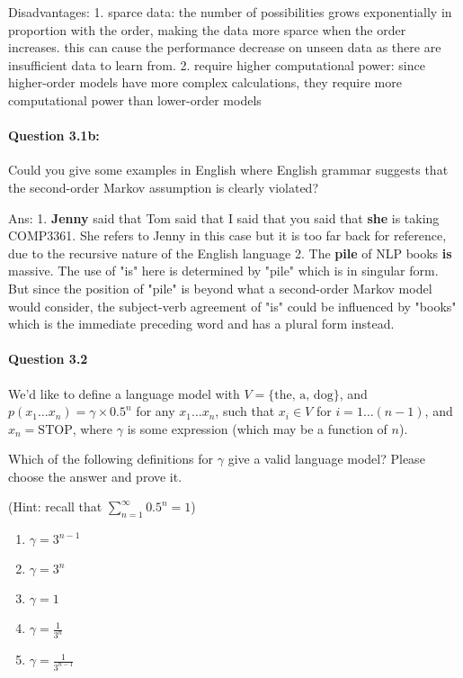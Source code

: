 \documentclass[10pt]{article}
\begin{document}
    Disadvantages:
    1. sparce data: the number of possibilities grows exponentially in proportion with the order, making the data more sparce when the order increases. this can cause the performance decrease on unseen data as there are insufficient data to learn from.
    2. require higher computational power: since higher-order models have more complex calculations, they require more computational power than lower-order models

\paragraph{Question 3.1b:} Could you give some examples in English where English grammar suggests that the second-order Markov assumption is clearly violated?

    Ans: 
            1. \textbf{Jenny} said that Tom said that I said that you said that \textbf{she} is taking COMP3361. 
            She refers to Jenny in this case but it is too far back for reference, due to the recursive nature of the       English language
            2. The \textbf{pile} of NLP books \textbf{is} massive.
            The use of "is" here is determined by "pile" which is in singular form. But since the position of "pile" is beyond what a second-order Markov model would consider, the subject-verb agreement of "is" could be influenced by "books" which is the immediate preceding word and has a plural form instead.


\newpage
\paragraph{Question 3.2}

We'd like to define a language model with \( V = \{\text{the, a, dog}\} \), and \( p(x_1 \ldots x_n) = \gamma \times 0.5^n \) for any \( x_1 \ldots x_n \), such that \( x_i \in V \) for \( i = 1 \ldots (n - 1) \), and \( x_n = \text{STOP} \), where \( \gamma \) is some expression (which may be a function of \( n \)).

Which of the following definitions for \( \gamma \) give a valid language model? Please choose the answer and prove it.

(Hint: recall that \( \sum_{n=1}^{\infty} 0.5^n = 1 \))

\begin{enumerate}
    \item \( \gamma = 3^{n-1} \)
    \item \( \gamma = 3^n \)
    \item \( \gamma = 1 \)
    \item \( \gamma = \frac{1}{3^n} \)
    \item \( \gamma = \frac{1}{3^{n-1}} \)
\end{enumerate}
\end{document}

